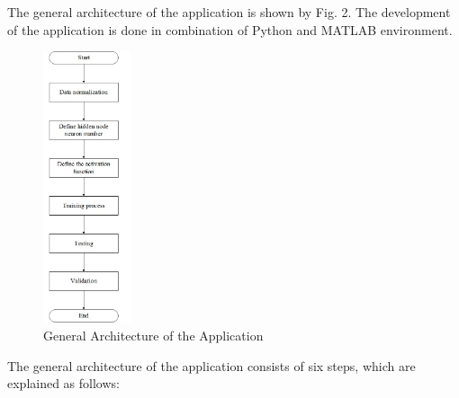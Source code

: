 \documentclass{ws-ijait}
\begin{document}
The general architecture of the application is shown by Fig. 2. The development of the application is done in combination of Python and MATLAB environment.

\begin{figure}[th]
\centerline{\includegraphics[height=8cm]{general_architecture.jpg}}
\vspace*{8pt}
\caption{General Architecture of the Application}
\label{Fig. 2}
\end{figure}

The general architecture of the application consists of six steps, which are explained as follows:
\end{document}
